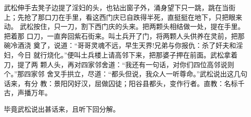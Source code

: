 武松伸手去凳子边提了淫妇的头，也钻出窗子外，涌身望下只一跳，跳在当街
上；先抢了那口刀在手里，看这西门庆已自跌得半死，直挺挺在地下，只把眼来动。
武松按住，只一刀，割下西门庆的头来。把两颗头相结做一处，提在手里。把着那
口刀，一直奔回紫石街来。叫土兵开了门，将两颗人头供养在灵前，把那碗冷酒浇
奠了，说道：“哥哥灵魂不远，早生天界!兄弟与你报仇：杀了奸夫和淫妇，今日
就行烧化。”便叫土兵楼上请高邻下来，把那婆子押在前面。武松拿着刀，提了两
颗人头，再对四家邻舍道：“我还有一句话，对你们四位高邻说则个。”那四家邻
舍叉手拱立，尽道：“都头但说，我众人一听尊命。”武松说出这几句话来，有分
教：景阳冈好汉，屈做囚徒；阳谷县都头，变作行者。直教：名标千古，声播万年。

毕竟武松说出甚话来，且听下回分解。